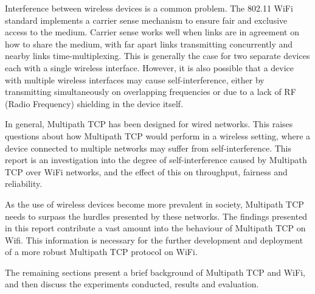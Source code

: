 Interference between wireless devices is a common problem. The 802.11 WiFi
standard implements a carrier sense mechanism to ensure fair and exclusive
access to the medium. Carrier sense works well when links are in agreement on 
how to share the medium, with far apart links transmitting concurrently and 
nearby links time-multiplexing. This is generally the case for two separate 
devices each with a single wireless interface. However, it is also possible that 
a device with multiple wireless interfaces may cause self-interference, either 
by transmitting simultaneously on overlapping frequencies or due to a lack of RF
(Radio Frequency) shielding in the device itself.

In general, Multipath TCP has been designed for wired networks. This raises
questions about how Multipath TCP would perform in a wireless setting, where a
device connected to multiple networks may suffer from self-interference. This
report is an investigation into the degree of self-interference caused by
Multipath TCP over WiFi networks, and the effect of this on throughput,
fairness and reliability.

As the use of wireless devices become more prevalent in society, Multipath 
TCP needs to surpass the hurdles presented by these networks. The findings 
presented in this report contribute a vast amount into the behaviour of Multipath TCP on Wifi. This information is necessary for the further development and 
deployment of a more robust Multipath TCP protocol on WiFi.

The remaining sections present a brief background of Multipath TCP and WiFi, and
then discuss the experiments conducted, results and evaluation.
